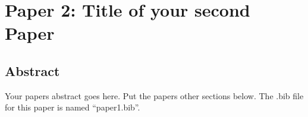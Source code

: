 \chapter{Paper 2: Title of your second Paper}

\section{Abstract}

Your papers abstract goes here. Put the papers other sections below.
The .bib file for this paper is named ``paper1.bib''.

\singlespacing


\doublespacing
